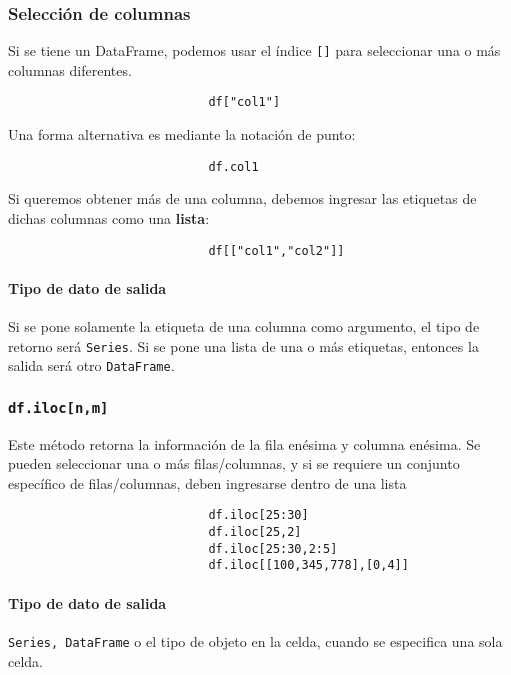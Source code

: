         \subsubsection{Selección de columnas}

        Si se tiene un DataFrame, podemos usar el índice \texttt{[]} para seleccionar una o más columnas diferentes.

        \begin{verbatim}
                            df["col1"]
                            \end{verbatim}
        Una forma alternativa es mediante la notación de punto:

        \begin{verbatim}
                            df.col1
                            \end{verbatim}
        Si queremos obtener más de una columna, debemos ingresar las etiquetas de dichas columnas como una \textbf{lista}:
        \begin{verbatim}
                            df[["col1","col2"]]
                            \end{verbatim}
        \paragraph{Tipo de dato de salida} Si se pone solamente la etiqueta de una columna como argumento, el tipo de retorno será \texttt{Series}. Si se pone una lista de una o más etiquetas, entonces la salida será otro \texttt{DataFrame}.

        \subsubsection{\texttt{df.iloc[n,m]}} Este método retorna la información de la fila enésima y columna enésima. Se pueden seleccionar una o más filas/columnas, y si se requiere un conjunto específico de filas/columnas, deben ingresarse dentro de una lista
        \begin{verbatim}
                            df.iloc[25:30]
                            df.iloc[25,2]
                            df.iloc[25:30,2:5]
                            df.iloc[[100,345,778],[0,4]]
                            \end{verbatim}
        \paragraph{Tipo de dato de salida} \texttt{Series, DataFrame} o el tipo de objeto en la celda, cuando se especifica una sola celda.

